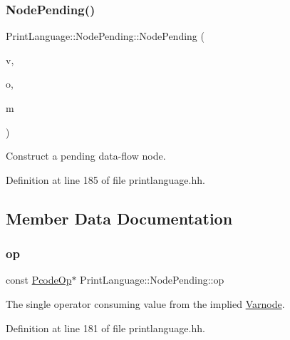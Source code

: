 \subsubsection{\texorpdfstring{NodePending()}{NodePending()}}
{\footnotesize\ttfamily Print\+Language\+::\+Node\+Pending\+::\+Node\+Pending (\begin{DoxyParamCaption}\item[{const \mbox{\hyperlink{class_varnode}{Varnode}} $\ast$}]{v,  }\item[{const \mbox{\hyperlink{class_pcode_op}{Pcode\+Op}} $\ast$}]{o,  }\item[{uint4}]{m }\end{DoxyParamCaption})\hspace{0.3cm}{\ttfamily [inline]}}



Construct a pending data-\/flow node. 



Definition at line 185 of file printlanguage.\+hh.



\subsection{Member Data Documentation}
\mbox{\label{struct_print_language_1_1_node_pending_a3f2183bccb0f2163cce4f598d44760d4}} 
\subsubsection{\texorpdfstring{op}{op}}
{\footnotesize\ttfamily const \mbox{\hyperlink{class_pcode_op}{Pcode\+Op}}$\ast$ Print\+Language\+::\+Node\+Pending\+::op}



The single operator consuming value from the implied \mbox{\hyperlink{class_varnode}{Varnode}}. 



Definition at line 181 of file printlanguage.\+hh.

\mbox{\label{struct_print_language_1_1_node_pending_ae0010f0e2a1595e804fac743c52d61b0}} 
